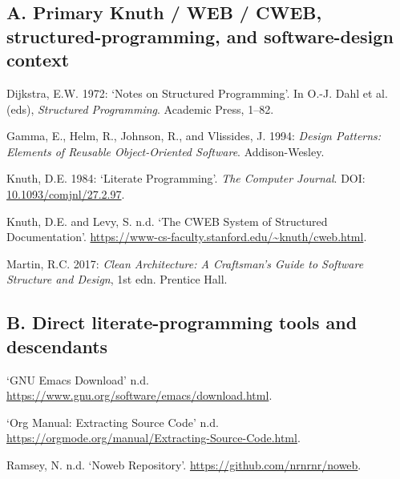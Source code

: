 \documentclass{ZGJournalArticle_2026}
\newlength{\cslhangindent}
\newenvironment{CSLReferences}[2] %
 {\begin{list}{}{%
  \sloppy
  \setlength{\itemindent}{0pt}
  \setlength{\leftmargin}{0pt}
  \setlength{\parsep}{0pt}
  \ifodd #1
   \setlength{\leftmargin}{\cslhangindent}
   \setlength{\itemindent}{-1\cslhangindent}
  \fi
  \setlength{\itemsep}{#2\baselineskip}}}
 {\end{list}}
\begin{document}
\subsection*{A. Primary Knuth / WEB / CWEB, structured-programming, and software-design context}
\begin{CSLReferences}{1}{0}
\hypertarget{ref-dijkstra1972notes}{}
Dijkstra, E.W. 1972: {`Notes on Structured Programming'}. In O.-J. Dahl
et al. (eds), \emph{Structured Programming}. Academic Press, 1--82.

\hypertarget{ref-gamma1994designPatterns}{}

Gamma, E., Helm, R., Johnson, R., and Vlissides, J. 1994: \emph{Design
Patterns: Elements of Reusable Object-Oriented Software}.
Addison-Wesley.

\hypertarget{ref-knuth1984a}{}

Knuth, D.E. 1984: {`Literate Programming'}. \emph{The Computer Journal}.
DOI:
\href{https://doi.org/10.1093/comjnl/27.2.97}{10.1093/comjnl/27.2.97}.

\hypertarget{ref-knuth1992a}{}

Knuth, D.E. and Levy, S. n.d. {`The CWEB System of Structured
Documentation'}.
\url{https://www-cs-faculty.stanford.edu/~knuth/cweb.html}.

\hypertarget{ref-martin2017cleanArchitecture}{}

Martin, R.C. 2017: \emph{Clean Architecture: A Craftsman's Guide to
Software Structure and Design}, 1st edn. Prentice Hall.

\end{CSLReferences}

\subsection*{B. Direct literate-programming tools and descendants}
\begin{CSLReferences}{1}{0}
\hypertarget{ref-gnuEmacsDownload}{}
{`GNU Emacs Download'} n.d.
\url{https://www.gnu.org/software/emacs/download.html}.

\hypertarget{ref-orgmanualExtractingSourceCode}{}

{`Org Manual: Extracting Source Code'} n.d.
\url{https://orgmode.org/manual/Extracting-Source-Code.html}.

\hypertarget{ref-ramsey1994a}{}

Ramsey, N. n.d. {`Noweb Repository'}.
\url{https://github.com/nrnrnr/noweb}.

\end{CSLReferences}
\end{document}
